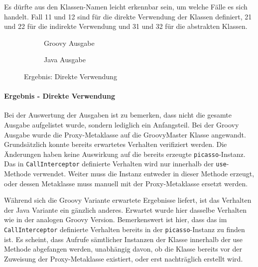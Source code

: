 Es dürfte aus den Klassen-Namen leicht erkennbar sein, um welche Fälle es sich handelt.
Fall 11 und 12 sind für die direkte Verwendung der Klassen definiert, 21 und 22  für die indirekte Verwendung und 31 und 32 für die abstrakten Klassen.







\begin{figure}[h!]
	\begin{subfigure}{\textwidth}
		
		\caption{Groovy Ausgabe}
		\label{fig:proxres-direct-groovy}
	\end{subfigure}

	\begin{subfigure}{\textwidth}
		
		\caption{Java Ausgabe}
		\label{fig:proxres-direct-java}
	\end{subfigure}
	
	\caption{Ergebnis: Direkte Verwendung}
	\label{fig:proxres-direct}
\end{figure}


\paragraph{Ergebnis - Direkte Verwendung}
Bei der Auswertung der Ausgaben ist zu bemerken, dass nicht die gesamte Ausgabe aufgelistet wurde, sondern lediglich ein Anfangsteil.
Bei der Groovy Ausgabe wurde die Proxy-Metaklasse auf die GroovyMaster Klasse angewandt. 
Grundsätzlich konnte bereits erwartetes Verhalten verifiziert werden. 
Die Änderungen haben keine Auswirkung auf die bereits erzeugte \texttt{picasso}-Instanz. 
Das in \texttt{CallInterceptor} definierte Verhalten wird nur innerhalb der \texttt{use}-Methode verwendet. Weiter muss die Instanz entweder in dieser Methode erzeugt, oder dessen Metaklasse muss manuell mit der Proxy-Metaklasse ersetzt werden.

Während sich die Groovy Variante erwartete Ergebnisse liefert, ist das Verhalten der Java Variante ein gänzlich anderes. 
Erwartet wurde hier dasselbe Verhalten wie in der analogen Groovy Version. 
Bemerkenswert ist hier, dass das im \texttt{CallInterceptor} definierte Verhalten bereits in der \texttt{picasso}-Instanz zu finden ist. 
Es scheint, dass Aufrufe sämtlicher Instanzen der Klasse innerhalb der use Methode abgefangen werden, unabhängig davon, ob die Klasse bereits vor der Zuweisung der Proxy-Metaklasse existiert, oder erst nachträglich erstellt wird.


